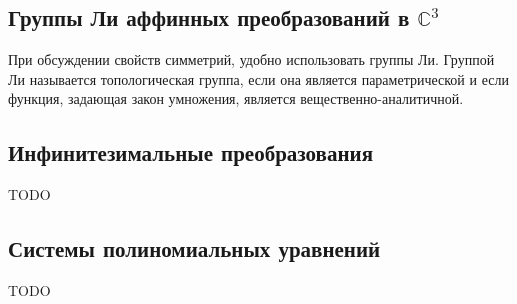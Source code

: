 \documentclass[../main.tex]{subfiles}
\begin{document}
\subsection{Группы Ли аффинных преобразований в $\mathbb{C}^3$}
При обсуждении свойств симметрий, удобно использовать группы Ли. Группой Ли называется топологическая группа, если она является параметрической и если функция, задающая закон умножения, является вещественно-аналитичной.

\subsection{Инфинитезимальные преобразования}
TODO
\subsection{Системы полиномиальных уравнений}
TODO
\end{document}
